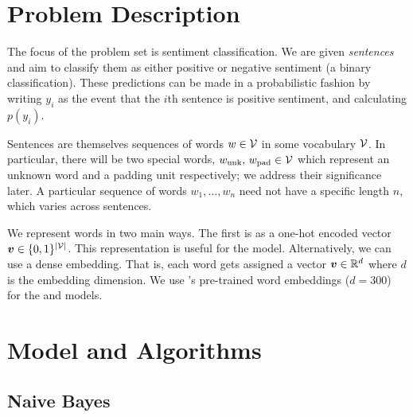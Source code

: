 \documentclass[11pt]{article}
\begin{document}



\section{Problem Description}

The focus of the problem set is sentiment classification. We are given
\emph{sentences} and aim to classify them as either positive or negative
sentiment (a binary classification). These predictions can be made in a
probabilistic fashion by writing $y_i$ as the event that the $i$th sentence is
positive sentiment, and calculating $p(y_i)$.

Sentences are themselves sequences of words $w \in \mathcal{V}$ in some vocabulary
$\mathcal{V}$. In particular, there will be two special words, $w_\text{unk},\,
w_\text{pad} \in \mathcal{V}$ which represent an unknown word and a padding unit
respectively; we address their significance later. A particular sequence of
words $w_1, \ldots, w_n$ need not have a specific length $n$, which varies
across sentences.

We represent words in two main ways. The first is as a one-hot encoded vector
$\boldsymbol{v} \in \{0,1\}^{|\mathcal{V}|}$. This representation is useful for the
 model. Alternatively, we can use a dense embedding.
That is, each word gets assigned a vector $\boldsymbol{v} \in \mathbb{R}^d$ where $d$ is
the embedding dimension. We use \citet{mikolov2013efficient}'s pre-trained word
embeddings ($d=300$) for the  and 
models.


\section{Model and Algorithms}
\label{sec:models}

\subsection{Naive Bayes}
\label{subsec:nb}
\end{document}
